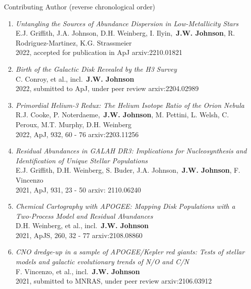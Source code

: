 \documentclass[cv.tex]{subfiles}
\begin{document}
\vspace{5mm}
\par\noindent
{\color{themecolor} \large Contributing Author}
(reverse chronological order)
\par\noindent
\begin{enumerate}

	\vspace{-3mm}

	\item \textit{Untangling the Sources of Abundance Dispersion in
	Low-Metallicity Stars}
	\\
	E.J. Griffith, J.A. Johnson, D.H. Weinberg, I. Ilyin,~\textbf{J.W. Johnson},
	R. Rodriguez-Martinez, K.G. Strassmeier
	\\
	2022, accepted for publication in ApJ \hfill arxiv:2210.01821

	\item \textit{Birth of the Galactic Disk Revealed by the H3 Survey}
	\\
	C. Conroy, et al., incl.~\textbf{J.W. Johnson}
	\\
	2022, submitted to ApJ, under peer review \hfill arxiv:2204.02989

	\item \textit{Primordial Helium-3 Redux: The Helium Isotope Ratio of the
	Orion Nebula}
	\\
	R.J. Cooke, P. Noterdaeme,~\textbf{J.W. Johnson}, M. Pettini, L. Welsh,
	C. Peroux, M.T. Murphy, D.H. Weinberg
	\\
	2022, ApJ, 932, 60 - 76 \hfill arxiv:2203.11256

	\item \textit{Residual Abundances in GALAH DR3: Implications for
	Nucleosynthesis and Identification of Unique Stellar Populations}
	\\
	E.J. Griffith, D.H. Weinberg, S. Buder, J.A. Johnson,~\textbf{J.W. Johnson},
	F. Vincenzo
	\\
	2021, ApJ, 931, 23 - 50 \hfill arxiv: 2110.06240

	\item \textit{Chemical Cartography with APOGEE: Mapping Disk Populations
	with a Two-Process Model and Residual Abundances}
	\\
	D.H. Weinberg, et al., incl.~\textbf{J.W. Johnson}
	\\
	2021, ApJS, 260, 32 - 77 \hfill arxiv:2108.08860

	\item \textit{CNO dredge-up in a sample of APOGEE/Kepler red giants: Tests
	of stellar models and galactic evolutionary trends of N/O and C/N}
	\\
	F. Vincenzo, et al., incl.~\textbf{J.W. Johnson}
	\\
	2021, submitted to MNRAS, under peer review \hfill arxiv:2106.03912


\end{enumerate}
\end{document}

